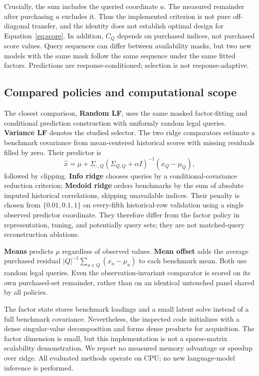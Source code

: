 \documentclass{article}
\begin{document}
Crucially, the sum includes the queried coordinate $a$. The measured remainder after purchasing $a$ excludes it. Thus the implemented criterion is not pure off-diagonal transfer, and the identity does not establish optimal design for Equation~\ref{eq:score}. In addition, $C_Q$ depends on purchased indices, not purchased score values. Query sequences can differ between availability masks, but two new models with the same mask follow the same sequence under the same fitted factors. Predictions are response-conditioned; selection is not response-adaptive.

\subsection{Compared policies and computational scope}
The closest comparison, \textbf{Random LF}, uses the same masked factor-fitting and conditional prediction construction with uniformly random legal queries. \textbf{Variance LF} denotes the studied selector. The two ridge comparators estimate a benchmark covariance from mean-centered historical scores with missing residuals filled by zero. Their predictor is
\begin{equation}
 \hat x=\mu+\Sigma_{:,Q}(\Sigma_{Q,Q}+\alpha I)^{-1}(x_Q-\mu_Q),
 \label{eq:ridge}
\end{equation}
followed by clipping. \textbf{Info ridge} chooses queries by a conditional-covariance reduction criterion; \textbf{Medoid ridge} orders benchmarks by the sum of absolute imputed historical correlations, skipping unavailable indices. Their penalty is chosen from $\{0.01,0.1,1\}$ on every-fifth historical-row validation using a single observed predictor coordinate. They therefore differ from the factor policy in representation, tuning, and potentially query sets; they are not matched-query reconstruction ablations.

\textbf{Means} predicts $\mu$ regardless of observed values. \textbf{Mean offset} adds the average purchased residual $|Q|^{-1}\sum_{a\in Q}(x_a-\mu_a)$ to each benchmark mean. Both use random legal queries. Even the observation-invariant comparator is scored on its own purchased-set remainder, rather than on an identical untouched panel shared by all policies.

The factor state stores benchmark loadings and a small latent solve instead of a full benchmark covariance. Nevertheless, the inspected code initializes with a dense singular-value decomposition and forms dense products for acquisition. The factor dimension is small, but this implementation is not a sparse-matrix scalability demonstration. We report no measured memory advantage or speedup over ridge. All evaluated methods operate on CPU; no new language-model inference is performed.
\end{document}

